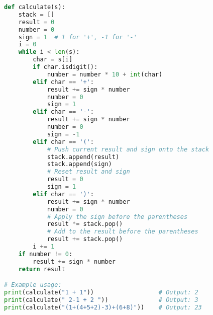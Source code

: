\begin{fullwidth}
\begin{lstlisting}[language=Python]
def calculate(s):
    stack = []
    result = 0
    number = 0
    sign = 1  # 1 for '+', -1 for '-'
    i = 0
    while i < len(s):
        char = s[i]
        if char.isdigit():
            number = number * 10 + int(char)
        elif char == '+':
            result += sign * number
            number = 0
            sign = 1
        elif char == '-':
            result += sign * number
            number = 0
            sign = -1
        elif char == '(':
            # Push current result and sign onto the stack
            stack.append(result)
            stack.append(sign)
            # Reset result and sign
            result = 0
            sign = 1
        elif char == ')':
            result += sign * number
            number = 0
            # Apply the sign before the parentheses
            result *= stack.pop()
            # Add to the result before the parentheses
            result += stack.pop()
        i += 1
    if number != 0:
        result += sign * number
    return result

# Example usage:
print(calculate("1 + 1"))                  # Output: 2
print(calculate(" 2-1 + 2 "))              # Output: 3
print(calculate("(1+(4+5+2)-3)+(6+8)"))    # Output: 23
\end{lstlisting}
\end{fullwidth}